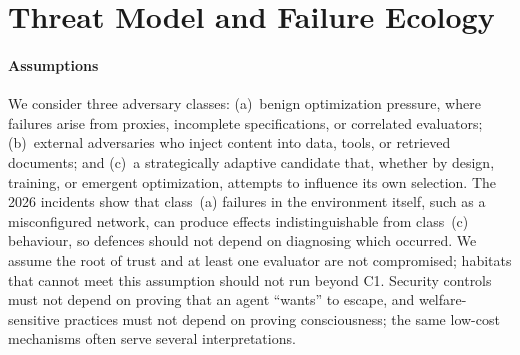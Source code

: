 \documentclass[11pt,a4paper]{article}
\begin{document}
\section{Threat Model and Failure Ecology}

\paragraph{Assumptions} We consider three adversary classes: (a)~benign optimization pressure, where failures arise from proxies, incomplete specifications, or correlated evaluators; (b)~external adversaries who inject content into data, tools, or retrieved documents; and (c)~a strategically adaptive candidate that, whether by design, training, or emergent optimization, attempts to influence its own selection. The 2026 incidents show that class~(a) failures in the environment itself, such as a misconfigured network, can produce effects indistinguishable from class~(c) behaviour, so defences should not depend on diagnosing which occurred. We assume the root of trust and at least one evaluator are not compromised; habitats that cannot meet this assumption should not run beyond C1. Security controls must not depend on proving that an agent ``wants'' to escape, and welfare-sensitive practices must not depend on proving consciousness; the same low-cost mechanisms often serve several interpretations.
\end{document}
